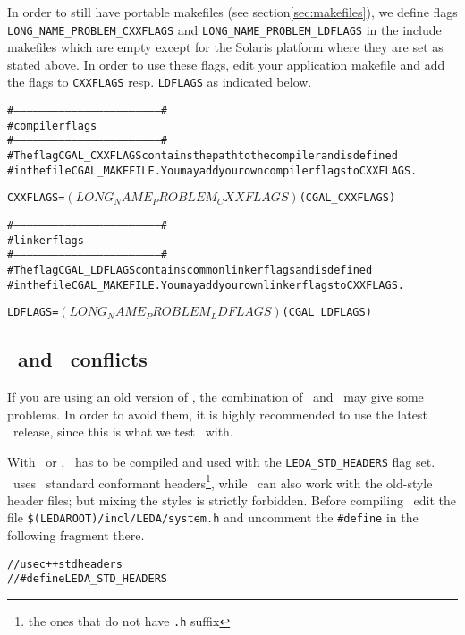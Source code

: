 In order to still have portable makefiles (see
section\ref{sec:makefiles}), we define flags
\texttt{LONG\_NAME\_PROBLEM\_CXXFLAGS} and
\texttt{LONG\_NAME\_PROBLEM\_LDFLAGS} in the include makefiles which
are empty except for the Solaris platform where they are set as stated
above. In order to use these flags, edit your application makefile and
add the flags to \texttt{CXXFLAGS} resp. \texttt{LDFLAGS} as indicated
below.
\begin{alltt}
#---------------------------------------------------------------------#
#                    compiler flags
#---------------------------------------------------------------------#
# The flag CGAL_CXXFLAGS contains the path to the compiler and is defined
# in the file CGAL_MAKEFILE. You may add your own compiler flags to CXXFLAGS.

CXXFLAGS = $(LONG_NAME_PROBLEM_CXXFLAGS) $(CGAL_CXXFLAGS) 

#---------------------------------------------------------------------#
#                    linker flags
#---------------------------------------------------------------------#
# The flag CGAL_LDFLAGS contains common linker flags and is defined
# in the file CGAL_MAKEFILE. You may add your own linker flags to CXXFLAGS.

LDFLAGS = $(LONG_NAME_PROBLEM_LDFLAGS) $(CGAL_LDFLAGS) 
\end{alltt}

\subsection{\leda\ and \stl\ conflicts}\label{subs:ledastlconfl}

If you are using an old version of \leda, the combination of \leda\ 
and \stl\ may give some problems. In order to avoid them, it is highly
recommended to use the latest \leda\ release, since this is what we
test \cgal\ with.

With \msvc\ or \bcc, \leda\ has to be compiled and used with the
\texttt{LEDA\_STD\_HEADERS} flag set. \cgal\ uses \CC\ standard
conformant headers\footnote{the ones that do not have \texttt{.h}
  suffix}, while \leda\ can also work with the old-style header files;
but mixing the styles is strictly forbidden. Before compiling \leda\,
edit the file \texttt{\$(LEDAROOT)/incl/LEDA/system.h} and uncomment
the \texttt{\#define} in the following fragment there.
\begin{alltt}
// use c++ std headers
//#define LEDA_STD_HEADERS
\end{alltt}

